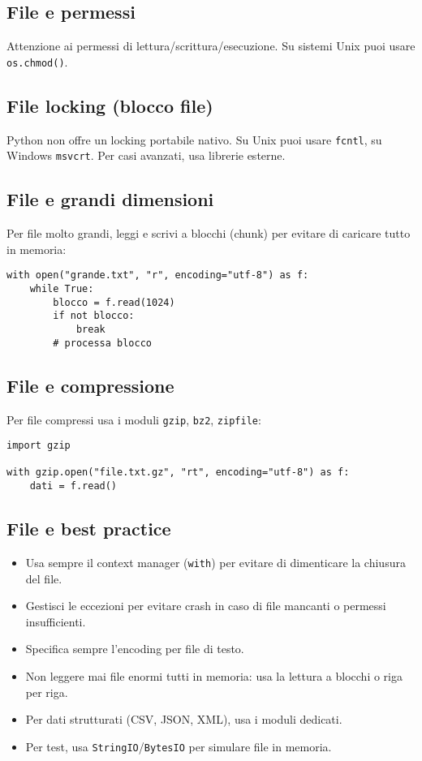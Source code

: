 \documentclass[a4paper,12pt]{article}
\begin{document}
\subsection*{File e permessi}
Attenzione ai permessi di lettura/scrittura/esecuzione. Su sistemi Unix puoi usare \texttt{os.chmod()}.

\subsection*{File locking (blocco file)}
Python non offre un locking portabile nativo. Su Unix puoi usare \texttt{fcntl}, su Windows \texttt{msvcrt}. Per casi avanzati, usa librerie esterne.

\subsection*{File e grandi dimensioni}
Per file molto grandi, leggi e scrivi a blocchi (chunk) per evitare di caricare tutto in memoria:
\begin{lstlisting}
with open("grande.txt", "r", encoding="utf-8") as f:
    while True:
        blocco = f.read(1024)
        if not blocco:
            break
        # processa blocco
\end{lstlisting}

\subsection*{File e compressione}
Per file compressi usa i moduli \texttt{gzip}, \texttt{bz2}, \texttt{zipfile}:
\begin{lstlisting}
import gzip

with gzip.open("file.txt.gz", "rt", encoding="utf-8") as f:
    dati = f.read()
\end{lstlisting}

\subsection*{File e best practice}
\begin{itemize}
    \item Usa sempre il context manager (\texttt{with}) per evitare di dimenticare la chiusura del file.
    \item Gestisci le eccezioni per evitare crash in caso di file mancanti o permessi insufficienti.
    \item Specifica sempre l'encoding per file di testo.
    \item Non leggere mai file enormi tutti in memoria: usa la lettura a blocchi o riga per riga.
    \item Per dati strutturati (CSV, JSON, XML), usa i moduli dedicati.
    \item Per test, usa \texttt{StringIO}/\texttt{BytesIO} per simulare file in memoria.
\end{itemize}
\end{document}
